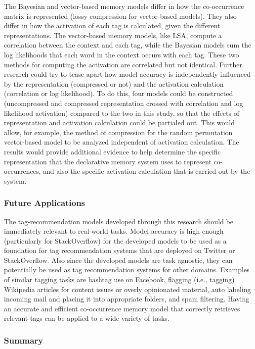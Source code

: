 \documentclass[man,floatsintext,donotrepeattitle]{apa6}
\begin{document}
The Bayesian and vector-based memory models differ in how the co-occurrence matrix is represented (lossy compression for vector-based models).
They also differ in how the activation of each tag is calculated, given the different representations.
The vector-based memory models, like LSA, compute a correlation between the context and each tag, while the Bayesian models sum the log likelihoods that each word in the context occurs with each tag.
These two methods for computing the activation are correlated but not identical.
Further research could try to tease apart how model accuracy is independently influenced by the representation (compressed or not) and the activation calculation (correlation or log likelihood).
To do this, four models could be constructed (uncompressed and compressed representation crossed with correlation and log likelihood activation) compared to the two in this study,
so that the effects of representation and activation calculation could be partialed out.
This would allow, for example, the method of compression for the random permutation vector-based model to be analyzed independent of activation calculation.
The results would provide additional evidence to help determine the specific representation that the declarative memory system uses to represent co-occurrences,
and also the specific activation calculation that is carried out by the system.

\subsubsection{Future Applications}

The tag-recommendation models developed through this research should be immediately relevant to real-world tasks.
Model accuracy is high enough (particularly for StackOverflow) for the developed models to be used as a foundation for tag recommendation systems that are deployed on Twitter or StackOverflow.
Also since the developed models are task agnostic, they can potentially be used as tag recommendation systems for other domains.
Examples of similar tagging tasks are hashtag use on Facebook, flagging (i.e., tagging) Wikipedia articles for content issues or overly opinionated material,
auto labeling incoming mail and placing it into appropriate folders, and spam filtering.
Having an accurate and efficient co-occurrence memory model that correctly retrieves relevant tags can be applied to a wide variety of tasks.

\subsubsection{Summary}
\end{document}
